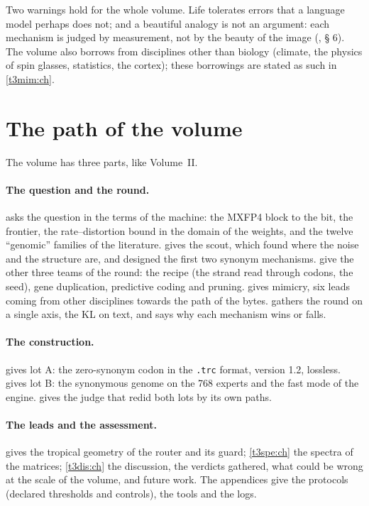 Two warnings hold for the whole volume. Life tolerates errors that a language model perhaps does not; and a beautiful analogy is not an argument: each mechanism is judged by measurement, not by the beauty of the image (, § 6). The volume also borrows from disciplines other than biology (climate, the physics of spin glasses, statistics, the cortex); these borrowings are stated as such in \cref{t3mim:ch}.

\section{The path of the volume}\label{t3int:sec:chemin}

The volume has three parts, like Volume~II.

\paragraph{The question and the round.}  asks the question in the terms of the machine: the MXFP4 block to the bit, the frontier, the rate--distortion bound in the domain of the weights, and the twelve ``genomic'' families of the literature.  gives the scout, which found where the noise and the structure are, and designed the first two synonym mechanisms.  give the other three teams of the round: the recipe (the strand read through codons, the seed), gene duplication, predictive coding and pruning.  gives mimicry, six leads coming from other disciplines towards the path of the bytes.  gathers the round on a single axis, the KL on text, and says why each mechanism wins or falls.

\paragraph{The construction.}  gives lot A: the zero-synonym codon in the \texttt{.trc} format, version 1.2, lossless.  gives lot B: the synonymous genome on the 768 experts and the fast mode of the engine.  gives the judge that redid both lots by its own paths.

\paragraph{The leads and the assessment.}  gives the tropical geometry of the router and its guard; \cref{t3spe:ch} the spectra of the matrices; \cref{t3dis:ch} the discussion, the verdicts gathered, what could be wrong at the scale of the volume, and future work. The appendices give the protocols (declared thresholds and controls), the tools and the logs.


